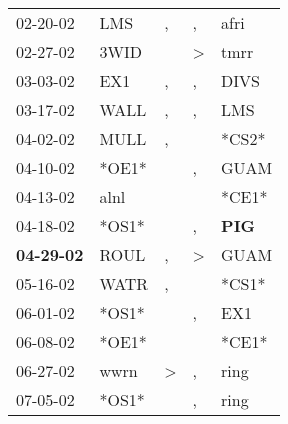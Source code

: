 \begin{supertabular}{p{0.07\textwidth}p{0.06\textwidth}p{0.02\textwidth}p{0.02\textwidth}p{0.06\textwidth}}
          02-20-02\textsuperscript{} &            LMS\textsuperscript{} &                , &                , &           afri\textsuperscript{} \\
          02-27-02\textsuperscript{} &           3WID\textsuperscript{} &                  &     \textgreater &           tmrr\textsuperscript{} \\
          03-03-02\textsuperscript{} &            EX1\textsuperscript{} &                , &                , &           DIVS\textsuperscript{} \\
          03-17-02\textsuperscript{} &           WALL\textsuperscript{} &                , &                , &            LMS\textsuperscript{} \\
          04-02-02\textsuperscript{} &           MULL\textsuperscript{} &                , &                  &                            *CS2* \\
          04-10-02\textsuperscript{} &                            *OE1* &                  &                , &           GUAM\textsuperscript{} \\
          04-13-02\textsuperscript{} &           alnl\textsuperscript{} &                  &                  &                            *CE1* \\
          04-18-02\textsuperscript{} &                            *OS1* &                  &                , &   \textbf{PIG\textsuperscript{}} \\
 \textbf{04-29-02\textsuperscript{}} &           ROUL\textsuperscript{} &                , &     \textgreater &           GUAM\textsuperscript{} \\
          05-16-02\textsuperscript{} &           WATR\textsuperscript{} &                , &                  &                            *CS1* \\
          06-01-02\textsuperscript{} &                            *OS1* &                  &                , &            EX1\textsuperscript{} \\
          06-08-02\textsuperscript{} &                            *OE1* &                  &                  &                            *CE1* \\
          06-27-02\textsuperscript{} &           wwrn\textsuperscript{} &     \textgreater &                , &           ring\textsuperscript{} \\
          07-05-02\textsuperscript{} &                            *OS1* &                  &                , &           ring\textsuperscript{} \\

\end{supertabular}
